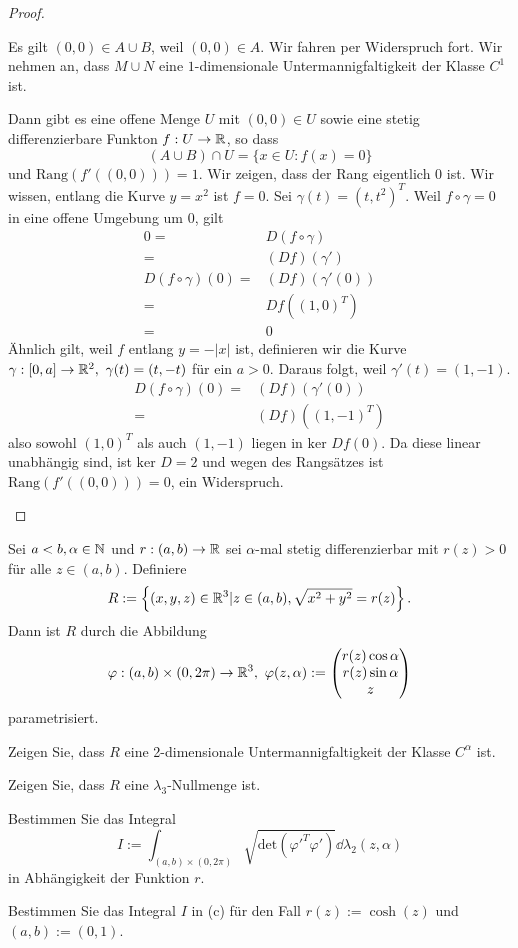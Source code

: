 \begin{proof}
\begin{parts}
	Es gilt $(0,0)\in A\cup B$, weil $(0,0)\in A$. Wir fahren per Widerspruch fort. Wir nehmen an, dass $M\cup N$ eine $1$-dimensionale Untermannigfaltigkeit der Klasse $C^1$ ist. 

	Dann gibt es eine offene Menge $U$ mit $(0,0)\in U$ sowie eine stetig differenzierbare Funkton $f:U\to \mathbb{R}$, so dass
	 \[
		 (A\cup B)\cap U=\{x\in U: f(x)=0\} 
	\] 
	und $\text{Rang}(f'((0,0)))=1$. Wir zeigen, dass der Rang eigentlich $0$ ist. Wir wissen, entlang die Kurve $y=x^2$ ist $f=0$. Sei $\gamma(t)= (t,t^2)^T$. Weil $f\circ \gamma=0$ in eine offene Umgebung um $0$, gilt
	\begin{align*}
		0=&D(f\circ \gamma)\\
		=&(Df)(\gamma')\\
		D(f\circ \gamma)(0)=&(Df)(\gamma'(0))\\
		=&Df((1,0)^T)\\
		=&0
	\end{align*}
	Ähnlich gilt, weil $f$ entlang $y=-|x|$ ist, definieren wir die Kurve $\gamma:[0,a]\to \mathbb{R}^2,~\gamma(t)=(t,-t)$ f\"{u}r ein $a>0$. Daraus folgt, weil $\gamma'(t)=(1,-1)$.
	\begin{align*}
		D(f\circ\gamma)(0)=&(Df)(\gamma'(0))\\
		=&(Df)((1,-1)^T)
	\end{align*}
	also sowohl $(1,0)^T$ als auch $(1,-1)$ liegen in $\text{ker }Df(0)$. Da diese linear unabhängig sind, ist $\text{ker }D=2$ und wegen des Rangsätzes ist $\text{Rang}(f'((0,0)))=0$, ein Widerspruch.\qedhere
	\end{parts}
\end{proof}
\begin{Problem}
	Sei $a<b,\alpha\in \mathbb{N}$ und $r:(a,b)\to \mathbb{R}$ sei $\alpha$-mal stetig differenzierbar mit $r(z)>0$ f\"{u}r alle $z\in (a,b)$. Definiere
	\[
	R:=\left\{ (x,y,z)\in \mathbb{R}^3|z\in (a,b), \sqrt{x^2+y^2} =r(z) \right\} 
	.\] 
	Dann ist $R$ durch die Abbildung
	\[
	\varphi:(a,b)\times (0,2\pi)\to \mathbb{R}^3,~\varphi(z,\alpha):=\begin{pmatrix} r(z)\cos\alpha \\ r(z)\sin\alpha \\ z \end{pmatrix} 
\]
parametrisiert.
\begin{parts}
\item Zeigen Sie, dass $R$ eine 2-dimensionale Untermannigfaltigkeit der Klasse $C^\alpha$ ist.
\item Zeigen Sie, dass $R$ eine $\lambda_3$-Nullmenge ist.
\item Bestimmen Sie das Integral
	\[
		I:=\int_{(a,b)\times (0,2\pi)} \sqrt{\text{det}(\varphi'^T\varphi')} \dd{\lambda_2(z,\alpha)}
	\]
	in Abhängigkeit der Funktion $r$.
\item Bestimmen Sie das Integral $I$ in (c) f\"{u}r den Fall $r(z):=\cosh(z)$ und $(a,b):=(0,1)$.
\end{parts}
\end{Problem}
